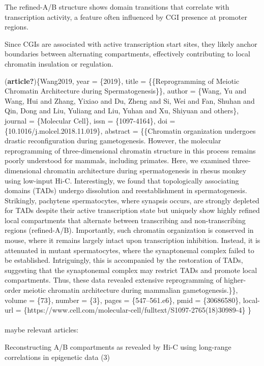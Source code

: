 \documentclass[
  a4paper,
  openany]{scrbook}
\makeatletter
\let\oldparagraph\paragraph
\renewcommand{\paragraph}{
    \@ifstar
      \xxxParagraphStar
      \xxxParagraphNoStar
  }
\newcommand{\xxxParagraphStar}[1]{\oldparagraph*{#1}\mbox{}}
\newcommand{\xxxParagraphNoStar}[1]{\oldparagraph{#1}\mbox{}}
\makeatother
\begin{document}
The refined-A/B structure shows domain transitions that correlate with
transcription activity, a feature often influenced by CGI presence at
promoter regions.

Since CGIs are associated with active transcription start sites, they
likely anchor boundaries between alternating compartments, effectively
contributing to local chromatin insulation or regulation.

(\textbf{article?})\{Wang2019, year = \{2019\}, title =
\{\{Reprogramming of Meiotic Chromatin Architecture during
Spermatogenesis\}\}, author = \{Wang, Yu and Wang, Hui and Zhang, Yixiao
and Du, Zheng and Si, Wei and Fan, Shuhan and Qin, Dong and Liu, Yuliang
and Liu, Yuhan and Xu, Shiyuan and others\}, journal = \{Molecular
Cell\}, issn = \{1097-4164\}, doi = \{10.1016/j.molcel.2018.11.019\},
abstract = \{\{Chromatin organization undergoes drastic reconfiguration
during gametogenesis. However, the molecular reprogramming of
three-dimensional chromatin structure in this process remains poorly
understood for mammals, including primates. Here, we examined
three-dimensional chromatin architecture during spermatogenesis in
rhesus monkey using low-input Hi-C. Interestingly, we found that
topologically associating domains (TADs) undergo dissolution and
reestablishment in spermatogenesis. Strikingly, pachytene spermatocytes,
where synapsis occurs, are strongly depleted for TADs despite their
active transcription state but uniquely show highly refined local
compartments that alternate between transcribing and non-transcribing
regions (refined-A/B). Importantly, such chromatin organization is
conserved in mouse, where it remains largely intact upon transcription
inhibition. Instead, it is attenuated in mutant spermatocytes, where the
synaptonemal complex failed to be established. Intriguingly, this is
accompanied by the restoration of TADs, suggesting that the synaptonemal
complex may restrict TADs and promote local compartments. Thus, these
data revealed extensive reprogramming of higher-order meiotic chromatin
architecture during mammalian gametogenesis.\}\}, volume = \{73\},
number = \{3\}, pages = \{547--561.e6\}, pmid = \{30686580\}, local-url
= \{https://www.cell.com/molecular-cell/fulltext/S1097-2765(18)30989-4\}
\}

\paragraph{maybe relevant articles:}\label{maybe-relevant-articles}

Reconstructing A/B compartments as revealed by Hi-C using long-range
correlations in epigenetic data (3)
\end{document}

